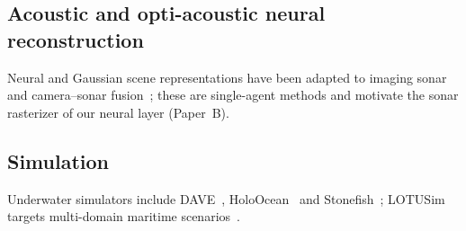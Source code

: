 \subsection{Acoustic and opti-acoustic neural reconstruction}
Neural and Gaussian scene representations have been adapted to imaging sonar and camera--sonar
fusion~\cite{qadri2024aoneus, qu2025zsplat, sethuraman2025sonarsplat}; these are single-agent
methods and motivate the sonar rasterizer of our neural layer (Paper~B).

\subsection{Simulation}
Underwater simulators include DAVE~\cite{zhang2022dave}, HoloOcean~\cite{potokar2022holoocean}
and Stonefish~\cite{cieslak2019stonefish}; LOTUSim targets multi-domain maritime
scenarios~\cite{lotusim2026}. 
